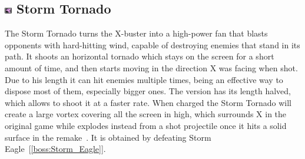 \subsection{\includegraphics[width=12px, height=10px]{figures/X1/weapons/Storm_T.jpg} Storm Tornado}\label{Storm_tornado}
The Storm Tornado turns the X-buster into a high-power fan that blasts opponents with hard-hitting wind, capable of destroying enemies that stand in its path. It shoots an horizontal tornado which stays on the screen for a short amount of time, and then starts moving in the direction X was facing when shot. Due to his length it can hit enemies multiple times, being an effective way to dispose most of them, especially bigger ones.  The \mhx version has its length halved, which allows to shoot it at a faster rate. When charged the Storm Tornado will create a large vortex covering all the screen in high, which surrounds X in the original game while explodes instead from a shot projectile once it hits a solid surface in the remake~\cite{wiki:Storm_tornado}. It is obtained by defeating Storm Eagle~[\ref{boss:Storm_Eagle}].

